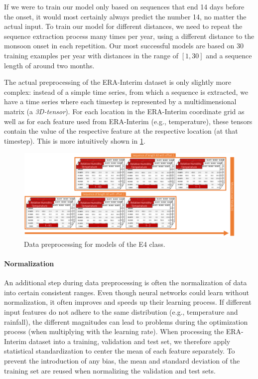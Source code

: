 If we were to train our model only based on sequences that end 14 days before the onset, it would most certainly always predict the number 14, no matter the actual input. To train our model for different distances, we need to repeat the sequence extraction process many times per year, using a different distance to the monsoon onset in each repetition. Our most successful models are based on 30 training examples per year with distances in the range of $[1, 30]$ and a sequence length of around two months.

The actual preprocessing of the ERA-Interim dataset is only slightly more complex: instead of a simple time series, from which a sequence is extracted, we have a time series where each timestep is represented by a multidimensional matrix (a \textit{3D-tensor}). For each location in the ERA-Interim coordinate grid as well as for each feature used from ERA-Interim (e.g., temperature), these tensors contain the value of the respective feature at the respective location (at that timestep). This is more intuitively shown in \cref{fig:e4_preprocessing}.

\begin{figure}[h]
  \centering
  \includegraphics[width=\linewidth]{./99_appendix/img/E4_preprocessing}
  \caption{Data preprocessing for models of the E4 class.}
  \label{fig:e4_preprocessing}
\end{figure}

\paragraph{Normalization} An additional step during data preprocessing is often the normalization of data into certain consistent ranges. Even though neural networks could learn without normalization, it often improves and speeds up their learning process. If different input features do not adhere to the same distribution (e.g., temperature and rainfall), the different magnitudes can lead to problems during the optimization process (when multiplying with the learning rate). When processing the ERA-Interim dataset into a training, validation and test set, we therefore apply statistical standardization to center the mean of each feature separately. To prevent the introduction of any bias, the mean and standard deviation of the training set are reused when normalizing the validation and test sets.

